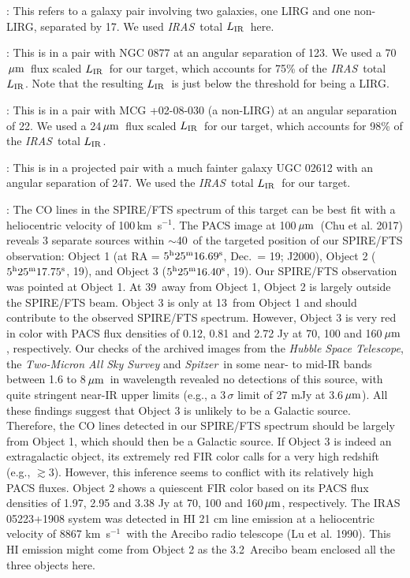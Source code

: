 \documentclass[preprint]{aastex}
\newcommand{\um}{\mbox{$\,\mu{\rm m}$}}
\newcommand{\kms}{\mbox{\,km~s$^{-1}$}}
\newcommand{\IRAS}{{\it IRAS}}
\newcommand{\Spitzer}{{\it Spitzer}}
\newcommand{\LIR}{\mbox{$L_{\rm IR}$}}
\begin{document}
: This refers to a galaxy pair involving two galaxies, one LIRG and one
          non-LIRG, separated by 17\arcsec. We used \IRAS\ total \LIR\ here.

: This is in a pair with NGC 0877 at an angular separation of 123\arcsec. 
          We used a 70\um\ flux scaled \LIR\ for our target, which accounts for 75\% of 
          the \IRAS\ total \LIR.  Note that the resulting \LIR\ is just below the threshold for
	  being a LIRG.

: This is in a pair with MCG +02-08-030 (a non-LIRG) at an angular separation of 
          22\arcsec.  We used a 24\um\ flux scaled \LIR\ for our target, which accounts for 98\% of
	  the \IRAS\ total \LIR.

: This is in a projected pair with a much fainter galaxy UGC 02612 with an angular 
          separation of 247\arcsec.  We used the \IRAS\ total \LIR\ for our target.


: The CO lines in the SPIRE/FTS spectrum of this target can be best fit with a 
	    heliocentric velocity of 100\kms.
	   The PACS image at 100\um\ (Chu et al. 2017) reveals 3 separate sources within $\sim$40\arcsec\
          of the targeted position of our SPIRE/FTS observation: Object 1 (at RA = $5^{\rm h}25^{\rm m}16.69^{\rm s}$, 
          Dec.~= 19\arcmin48.7\arcsec; J2000),
	  Object 2 ($5^{\rm h}25^{\rm m}17.75^{\rm s}$, 19\arcsec), and Object 3
	  ($5^{\rm h}25^{\rm m}16.40^{\rm s}$, 19\arcdeg10\arcmin35.9\arcsec).  Our SPIRE/FTS observation was pointed
          at Object 1. At 39\arcsec\ away from Object 1, Object 2 is largely outside the SPIRE/FTS beam. Object 3 is only 
          at 13\arcsec\ from Object 1 and should contribute to the observed SPIRE/FTS spectrum.  However, Object 3 is very red 
	  in color with PACS flux densities of 0.12, 0.81 and 2.72 Jy at 70, 100 and 160\um, respectively. Our checks of 
          the archived images from the {\it Hubble Space Telescope},  the {\it Two-Micron All Sky Survey} and \Spitzer\ 
	  in some near- to mid-IR bands between 1.6 to 8\um\ in wavelength 
	  revealed no detections of this source, with quite stringent near-IR 
          upper limits (e.g., a 3\,$\sigma$ limit of 27 mJy at 3.6\um).  All these findings suggest that Object 3 is unlikely 
          to be a Galactic source.  Therefore, the CO lines detected in our SPIRE/FTS spectrum should be largely from Object 1,
          which should then be a Galactic source.  If Object 3 is indeed an extragalactic object, its extremely 
          red FIR color calls for a very high redshift (e.g., $\gtrsim 3$).  However, this inference seems to conflict
  	  with its relatively high PACS fluxes.  Object 2 shows a quiescent FIR color based on its PACS flux densities of 
	  1.97, 2.95 and 3.38 Jy at 70, 100 and 160\um, respectively.  The IRAS 05223+1908 system was detected in HI 21 cm line
	  emission at a heliocentric velocity of 8867\,\kms\ with the Arecibo radio telescope (Lu et al. 1990).  This HI emission
          might come from Object 2 as the 3.2\arcmin\ Arecibo beam enclosed all the three objects here.
\end{document}
